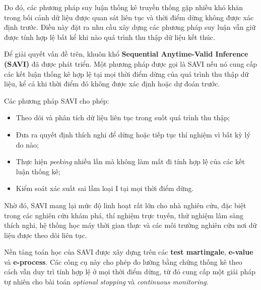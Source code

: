 Do đó, các phương pháp suy luận thống kê truyền thống gặp nhiều khó khăn trong bối cảnh dữ liệu được quan sát liên tục và thời điểm dừng không được xác định trước. Điều này đặt ra nhu cầu xây dựng các phương pháp suy luận vẫn giữ được tính hợp lệ bất kể khi nào quá trình thu thập dữ liệu kết thúc.

Để giải quyết vấn đề trên, khuôn khổ
\textbf{Sequential Anytime-Valid Inference (SAVI)}
đã được phát triển. Một phương pháp được gọi là SAVI nếu nó cung cấp các kết luận thống kê hợp lệ tại mọi thời điểm dừng của quá trình thu thập dữ liệu, kể cả khi thời điểm đó không được xác định hoặc dự đoán trước.

Các phương pháp SAVI cho phép:

\begin{itemize}
    \item Theo dõi và phân tích dữ liệu liên tục trong suốt quá trình thu thập;

    \item Đưa ra quyết định thích nghi để dừng hoặc tiếp tục thí nghiệm vì bất kỳ lý do nào;

    \item Thực hiện \textit{peeking} nhiều lần mà không làm mất đi tính hợp lệ của các kết luận thống kê;

    \item Kiểm soát xác suất sai lầm loại I tại mọi thời điểm dừng.
\end{itemize}

Nhờ đó, SAVI mang lại mức độ linh hoạt rất lớn cho nhà nghiên cứu, đặc biệt trong các nghiên cứu khám phá, thí nghiệm trực tuyến, thử nghiệm lâm sàng thích nghi, hệ thống học máy thời gian thực và các môi trường nghiên cứu nơi dữ liệu được theo dõi liên tục.

Nền tảng toán học của SAVI được xây dựng trên các
\textbf{test martingale}, \textbf{e-value} và \textbf{e-process}.
Các công cụ này cho phép đo lường bằng chứng thống kê theo cách vẫn duy trì tính hợp lệ ở mọi thời điểm dừng, từ đó cung cấp một giải pháp tự nhiên cho bài toán \textit{optional stopping} và \textit{continuous monitoring}.
